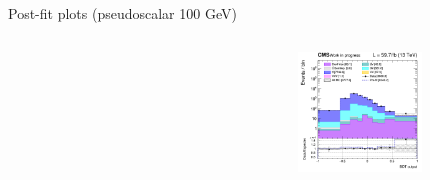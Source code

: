 \documentclass[8pt]{beamer}
\begin{document}
\begin{frame}{Post-fit plots (pseudoscalar 100 GeV)}
\begin{columns}
\begin{column}{0.33\textwidth}
\begin{center}
    		\end{center}		
		\end{column} 
		\begin{column}{0.33\textwidth}
			\begin{center}
			\begin{block}{}\end{block}	
     			\includegraphics[width=1.0\textwidth, height=90pt]{figs/postfits/2018/log_cratio_ST_topCR_ll_BDT_tDM100_TTbar_BDT_output_pseudoscalar100_customBinsAttempt7.png}
    		\end{center}		
		\end{column}
\end{columns}


\end{frame}
\end{document}
